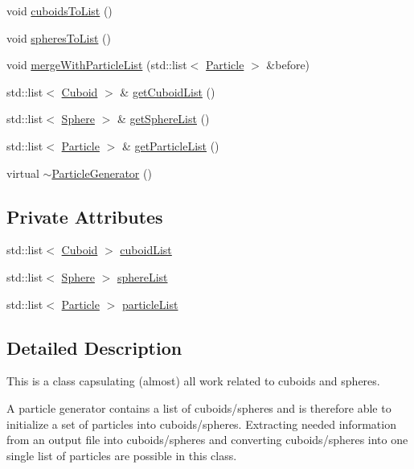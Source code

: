 \begin{DoxyCompactItemize}
void \hyperlink{classutils_1_1ParticleGenerator_a89a4177490575ae9486e0eaecdb52dfd}{cuboids\-To\-List} ()
\item 
void \hyperlink{classutils_1_1ParticleGenerator_a2ea629339cda550d6daae10ec339296e}{spheres\-To\-List} ()
\item 
void \hyperlink{classutils_1_1ParticleGenerator_a7048e1fc122f6e5e962f23071031a0e0}{merge\-With\-Particle\-List} (std\-::list$<$ \hyperlink{classParticle}{Particle} $>$ \&before)
\item 
std\-::list$<$ \hyperlink{classCuboid}{Cuboid} $>$ \& \hyperlink{classutils_1_1ParticleGenerator_ad8da4620c020650970252213333b939e}{get\-Cuboid\-List} ()
\item 
std\-::list$<$ \hyperlink{classSphere}{Sphere} $>$ \& \hyperlink{classutils_1_1ParticleGenerator_a50edacf6ec960526e5182aaa5e62a192}{get\-Sphere\-List} ()
\item 
std\-::list$<$ \hyperlink{classParticle}{Particle} $>$ \& \hyperlink{classutils_1_1ParticleGenerator_a59ad1749a839f3e89e58d3f92ec94b4f}{get\-Particle\-List} ()
\item 
virtual \hyperlink{classutils_1_1ParticleGenerator_a37a629906f87d7200989d6bb2dff796d}{$\sim$\-Particle\-Generator} ()
\end{DoxyCompactItemize}
\subsection*{Private Attributes}
\begin{DoxyCompactItemize}
\item 
std\-::list$<$ \hyperlink{classCuboid}{Cuboid} $>$ \hyperlink{classutils_1_1ParticleGenerator_a2b4d4491fa74e20a23f7affc96de834a}{cuboid\-List}
\item 
std\-::list$<$ \hyperlink{classSphere}{Sphere} $>$ \hyperlink{classutils_1_1ParticleGenerator_a51b9b7685b429b44bd889a9b62b25ec2}{sphere\-List}
\item 
std\-::list$<$ \hyperlink{classParticle}{Particle} $>$ \hyperlink{classutils_1_1ParticleGenerator_a83e8886303b0e6d0e1b269cb54e7d04b}{particle\-List}
\end{DoxyCompactItemize}


\subsection{Detailed Description}
This is a class capsulating (almost) all work related to cuboids and spheres. 

A particle generator contains a list of cuboids/spheres and is therefore able to initialize a set of particles into cuboids/spheres. Extracting needed information from an output file into cuboids/spheres and converting cuboids/spheres into one single list of particles are possible in this class. 

